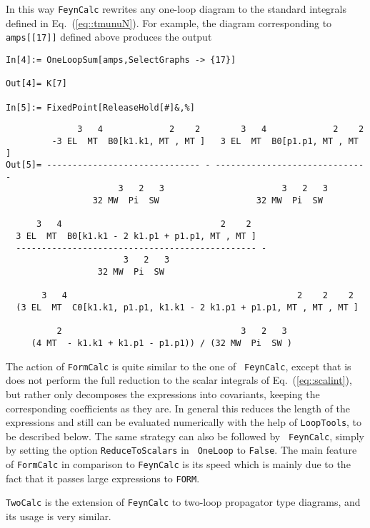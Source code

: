In this way {\tt FeynCalc} rewrites any one-loop diagram to the standard
integrals defined in Eq.~(\ref{eq::tmunuN}).  For example, the diagram
corresponding to {\tt amps[[17]]} defined above produces the output
\begin{verbatim}
In[4]:= OneLoopSum[amps,SelectGraphs -> {17}]

Out[4]= K[7]

In[5]:= FixedPoint[ReleaseHold[#]&,%]
\end{verbatim}
\begin{verbatim}
              3   4             2    2        3   4             2    2
         -3 EL  MT  B0[k1.k1, MT , MT ]   3 EL  MT  B0[p1.p1, MT , MT ]
Out[5]= ------------------------------ - ----------------------------- - 
                      3   2   3                       3   2   3
                 32 MW  Pi  SW                   32 MW  Pi  SW
 
      3   4                               2    2
  3 EL  MT  B0[k1.k1 - 2 k1.p1 + p1.p1, MT , MT ]
  ----------------------------------------------- - 
                       3   2   3
                  32 MW  Pi  SW
 
       3   4                                             2    2    2
  (3 EL  MT  C0[k1.k1, p1.p1, k1.k1 - 2 k1.p1 + p1.p1, MT , MT , MT ] 
 
          2                                   3   2   3
     (4 MT  - k1.k1 + k1.p1 - p1.p1)) / (32 MW  Pi  SW )
\end{verbatim}
The action of {\tt FormCalc} is quite similar to the one of {\tt
  FeynCalc}, except that is does not perform the full reduction to the
scalar integrals of Eq.~(\ref{eq::scalint}), but rather only decomposes
the expressions into covariants, keeping the corresponding coefficients
as they are. In general this reduces the length of the expressions and
still can be evaluated numerically with the help of {\tt LoopTools}, to
be described below. The same strategy can also be followed by {\tt
  FeynCalc}, simply by setting the option {\tt ReduceToScalars} in {\tt
  OneLoop} to {\tt False}.  The main feature of {\tt FormCalc} in
comparison to {\tt FeynCalc} is its speed which is mainly due to the
fact that it passes large expressions to {\tt FORM}.

{\tt TwoCalc} is the extension of {\tt FeynCalc} to two-loop propagator
type diagrams, and its usage is very similar.

